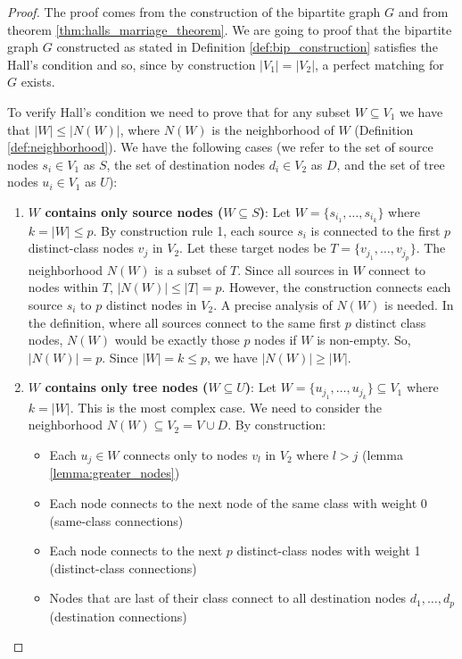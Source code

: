 \begin{proof}
    The proof comes from the construction of the bipartite graph $G$ and from theorem \ref{thm:halls_marriage_theorem}. We are going to proof that the bipartite graph $G$ constructed as stated in Definition \ref{def:bip_construction} satisfies the Hall's condition and so, since by construction $|V_1| = |V_2|$, a perfect matching for $G$ exists.

    To verify Hall's condition we need to prove that for any subset $W \subseteq V_1$ we have that $|W| \leq |N(W)|$, where $N(W)$ is the neighborhood of $W$ (Definition \ref{def:neighborhood}). We have the following cases (we refer to the set of source nodes $s_i \in V_1$ as $S$, the set of destination nodes $d_i \in V_2$ as $D$, and the set of tree nodes $u_i \in V_1$ as $U$):
    \begin{enumerate}
        \item \textbf{$W$ contains only source nodes ($W \subseteq S$)}: Let $W = \{s_{i_1}, \dots, s_{i_k}\}$ where $k = |W| \leq p$. By construction rule 1, each source $s_i$ is connected to the first $p$ distinct-class nodes $v_j$ in $V_2$. Let these target nodes be $T = \{v_{j_1}, \dots, v_{j_p}\}$. The neighborhood $N(W)$ is a subset of $T$. Since all sources in $W$ connect to nodes within $T$, $|N(W)| \leq |T| = p$. However, the construction connects each source $s_i$ to $p$ distinct nodes in $V_2$. A precise analysis of $N(W)$ is needed. In the definition, where all sources connect to the same first $p$ distinct class nodes, $N(W)$ would be exactly those $p$ nodes if $W$ is non-empty. So, $|N(W)| = p$. Since $|W| = k \leq p$, we have $|N(W)| \geq |W|$.
        \item \textbf{$W$ contains only tree nodes ($W \subseteq U$)}: Let $W = \{u_{j_1}, \dots, u_{j_k}\} \subseteq V_1$ where $k = |W|$. This is the most complex case. We need to consider the neighborhood $N(W) \subseteq V_2 = V \cup D$. By construction:
        \begin{itemize}
            \item Each $u_j \in W$ connects only to nodes $v_l$ in $V_2$ where $l > j$ (lemma \ref{lemma:greater_nodes})
            \item Each node connects to the next node of the same class with weight 0 (same-class connections)
            \item Each node connects to the next $p$ distinct-class nodes with weight 1 (distinct-class connections) 
            \item Nodes that are last of their class connect to all destination nodes $d_1,\dots,d_p$ (destination connections)

\end{itemize}
\end{enumerate}
\end{proof}
